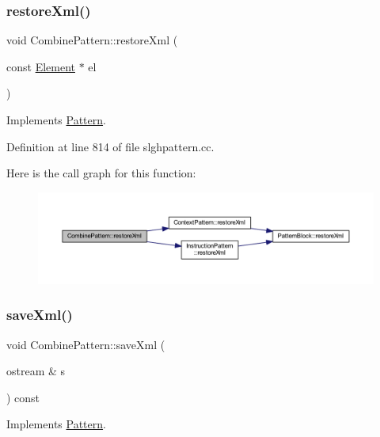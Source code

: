 \subsubsection{\texorpdfstring{restoreXml()}{restoreXml()}}
{\footnotesize\ttfamily void Combine\+Pattern\+::restore\+Xml (\begin{DoxyParamCaption}\item[{const \mbox{\hyperlink{class_element}{Element}} $\ast$}]{el }\end{DoxyParamCaption})\hspace{0.3cm}{\ttfamily [virtual]}}



Implements \mbox{\hyperlink{class_pattern_aaa8fb2873854fb42d944fa8876102bb5}{Pattern}}.



Definition at line 814 of file slghpattern.\+cc.

Here is the call graph for this function\+:
\nopagebreak
\begin{figure}[H]
\begin{center}
\leavevmode
\includegraphics[width=350pt]{class_combine_pattern_a4d72e9c16ce072982379a9da0bf2ad78_cgraph}
\end{center}
\end{figure}
\mbox{\label{class_combine_pattern_a77f1097e85459ca4ee70dad774df6535}} 
\subsubsection{\texorpdfstring{saveXml()}{saveXml()}}
{\footnotesize\ttfamily void Combine\+Pattern\+::save\+Xml (\begin{DoxyParamCaption}\item[{ostream \&}]{s }\end{DoxyParamCaption}) const\hspace{0.3cm}{\ttfamily [virtual]}}



Implements \mbox{\hyperlink{class_pattern_a1ad6c2ad66849318427095662b718fa9}{Pattern}}.




